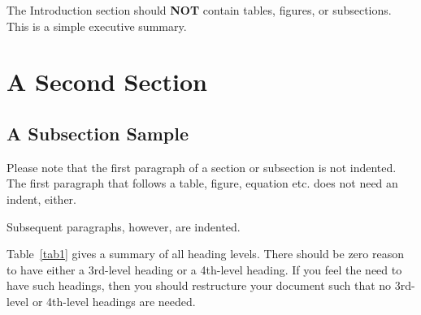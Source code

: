 \documentclass{llncs}
\begin{document}
The Introduction section should {\bf NOT} contain tables, figures, or subsections.  This is a simple executive summary.

\section{A Second Section}

\subsection{A Subsection Sample}

Please note that the first paragraph of a section or subsection is
not indented. The first paragraph that follows a table, figure,
equation etc. does not need an indent, either.

Subsequent paragraphs, however, are indented.



Table~\ref{tab1} gives a summary of all heading levels. There should be zero reason to have either a 3rd-level heading or a 4th-level heading. If you feel the need to have such headings, then you should restructure your document such that no 3rd-level or 4th-level headings are needed.
\end{document}
